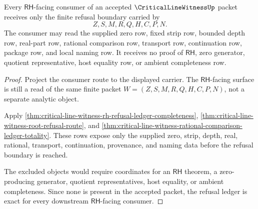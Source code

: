 \begin{theorem}
\label{thm:critical-line-witness-rh-refusal-ledger-exactness}
Every $\mathsf{RH}$-facing consumer of an accepted $\CriticalLineWitnessUp$ packet receives only the finite refusal boundary carried by
$$
Z,S,M,R,Q,H,C,P,N.
$$
The consumer may read the supplied zero row, fixed strip row, bounded depth row, real-part row, rational comparison row, transport row, continuation row, package row, and local naming row. It receives no proof of $\mathsf{RH}$, zero generator, quotient representative, host equality row, or ambient completeness row.
\end{theorem}
\begin{proof}
Project the consumer route to the displayed carrier. The $\mathsf{RH}$-facing surface is still a read of the same finite packet $W=(Z,S,M,R,Q,H,C,P,N)$, not a separate analytic object.

Apply \autoref{thm:critical-line-witness-rh-refusal-ledger-completeness}, \autoref{thm:critical-line-witness-root-refusal-route}, and \autoref{thm:critical-line-witness-rational-comparison-ledger-totality}. These rows expose only the supplied zero, strip, depth, real, rational, transport, continuation, provenance, and naming data before the refusal boundary is reached.

The excluded objects would require coordinates for an $\mathsf{RH}$ theorem, a zero-producing generator, quotient representatives, host equality, or ambient completeness. Since none is present in the accepted packet, the refusal ledger is exact for every downstream $\mathsf{RH}$-facing consumer.
\end{proof}
